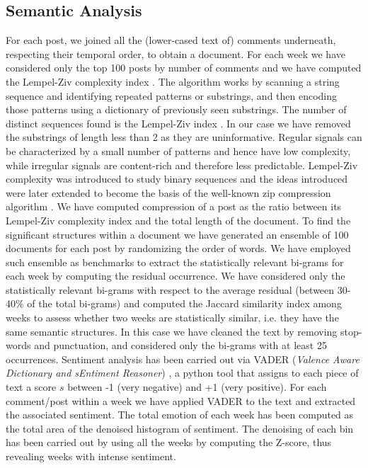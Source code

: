 \documentclass[fleqn,10pt]{wlscirep}
\begin{document}
\subsection*{Semantic Analysis}
%
For each post, we joined all the (lower-cased text of) comments underneath, respecting their temporal order, to obtain a document.
%
For each week we have considered only the top 100 posts by number of comments and we have computed the Lempel-Ziv complexity index \cite{lempel1976complexity}. 
The algorithm works by scanning a string sequence and identifying repeated patterns or substrings, and then encoding those patterns using a dictionary of previously seen substrings. The number of distinct sequences found is the Lempel-Ziv index \cite{lempel1976complexity}. In our case we have removed the substrings of length less than 2 as they are uninformative.
Regular signals can be characterized by a small number of patterns and hence have low complexity, while irregular signals are content-rich and therefore less predictable. Lempel-Ziv complexity was introduced to study binary sequences and the ideas introduced were later extended to become the basis of the well-known zip compression algorithm \cite{deutsch1996deflate}.
We have computed compression of a post as the ratio between its Lempel-Ziv complexity index and the total length of the document.
%
To find the significant structures within a document we have generated an ensemble of 100 documents for each post by randomizing the order of words. We have employed such ensemble as benchmarks to extract the statistically relevant bi-grams for each week by computing the residual occurrence.
We have considered only the statistically relevant bi-grams with respect to the average residual (between 30-40\% of the total bi-grams) and computed the Jaccard similarity index among weeks to assess whether two weeks are statistically similar, i.e. they have the same semantic structures. In this case we have cleaned the text by removing stop-words and punctuation, and considered only the bi-grams with at least 25 occurrences.
%
Sentiment analysis has been carried out via VADER (\emph{Valence Aware Dictionary and sEntiment Reasoner}) \cite{hutto2014VADER}, a python tool that assigns to each piece of text a score $s$ between -1 (very negative) and +1 (very positive). For each comment/post within a week we have applied VADER to the text and extracted the associated sentiment.
The total emotion of each week has been computed as the total area of the denoised histogram of sentiment. The denoising of each bin has been carried out by using all the weeks by computing the Z-score, thus revealing weeks with intense sentiment.
%
\end{document}
